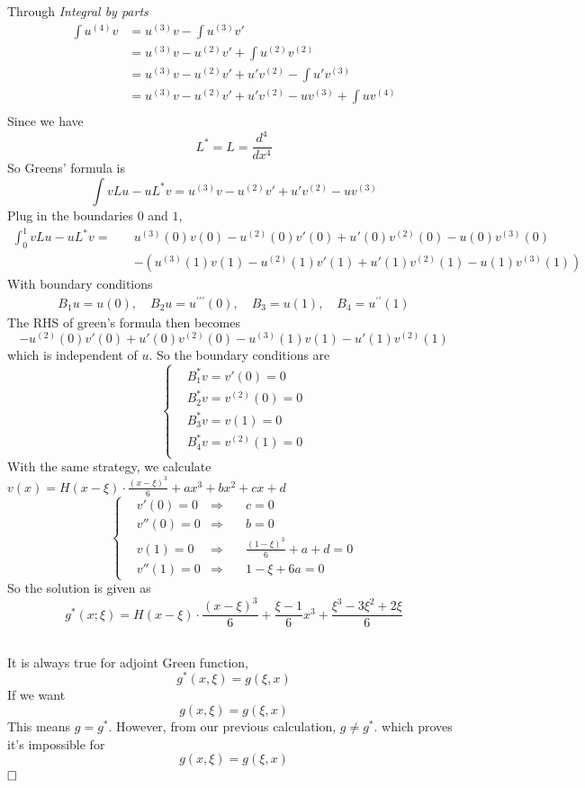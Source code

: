 \documentclass{article}
\newcommand{\qedhere}{$\hfill\ensuremath{\square}$}
\begin{document}
\subsection{}
Through \textit{Integral by parts}
\begin{align*}
\int u^{(4)}v &=u^{(3)}v -\int u^{(3)}v' \\
&=u^{(3)}v - u^{(2)}v' + \int u^{(2)}v^{(2)} \\
&=u^{(3)}v - u^{(2)}v' + u'v^{(2)}-\int u'v^{(3)} \\
&=u^{(3)}v - u^{(2)}v' + u'v^{(2)}-uv^{(3)} +\int uv^{(4)} \\
\end{align*}
Since we have 
\[
	L^* = L =  \frac{d^4}{dx^4}
\]	
So Greens' formula is
\[
	\int vLu-uL^*v = u^{(3)}v - u^{(2)}v' + u'v^{(2)}-uv^{(3)}
\]
Plug in the boundaries $0$ and $1$,
\[\begin{aligned}
	\int_0^1 vLu-uL^*v =\quad& u^{(3)}(0)v(0) - u^{(2)}(0)v'(0) + u'(0)v^{(2)}(0)-u(0)v^{(3)}(0)\\& - \left(u^{(3)}(1)v(1) - u^{(2)}(1)v'(1) + u'(1)v^{(2)}(1)-u(1)v^{(3)}(1)\right)
\end{aligned}
\]
With boundary conditions 
\begin{align*}
B_{1} u=u(0), \quad B_{2} u=u^{\prime \prime \prime}(0), \quad B_{3}=u(1), \quad B_{4}=u^{\prime \prime}(1)
\end{align*}
The RHS of green's formula then becomes
\[
	- u^{(2)}(0)v'(0) + u'(0)v^{(2)}(0)-u^{(3)}(1)v(1)-u'(1)v^{(2)}(1)
\]
which is independent of $u$. So the boundary conditions are 
\[
	\left\{
	\begin{aligned}
	&B_1^* v = v'(0) = 0\\
	&B_2^* v = v^{(2)}(0) = 0\\
	&B_3^* v = v(1) = 0\\
	&B_4^* v = v^{(2)}(1) = 0\\
	\end{aligned}
	\right.
\]
With the same strategy, we calculate $v(x) = H(x-\xi) \cdot \frac{(x-\xi)^3}{6}+ a x^3 + bx^2+cx+d$
\[\left\{
	\begin{aligned}
	&v'(0) = 0     &\Rightarrow \quad& c = 0\\
	&v''(0) = 0  &\Rightarrow \quad&b = 0 \\
	&v(1) = 0     &\Rightarrow \quad&\frac{(1-\xi)^3}{6}+a+d = 0\\
	&v''(1) = 0   &\Rightarrow \quad&1-\xi+6a = 0 
	\end{aligned}
  \right.
\]
So the solution is given as 
\[
	g^*(x;\xi) = H(x-\xi) \cdot \frac{(x-\xi)^3}{6}+ \frac{\xi-1}{6} x^3+\frac{\xi^3-3\xi^2+2\xi}{6}
\]
\subsection{}
It is always true for adjoint Green function,
\[
	g^*(x,\xi) = g(\xi,x)
\]
If we want 
\[
	g(x,\xi) = g(\xi,x)
\]
This means $g = g^*$. However, from our previous calculation, $g\neq g^*$. which proves it's impossible for \[
	g(x,\xi) = g(\xi,x)
\]
\qedhere
\end{document}
